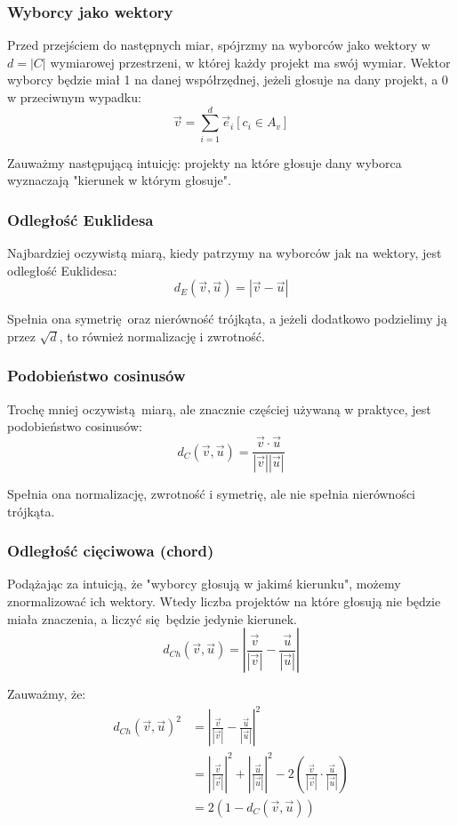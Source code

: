\documentclass{article}
\begin{document}
\subsubsection*{Wyborcy jako wektory}

Przed przejściem do następnych miar, spójrzmy na wyborców jako wektory w
$d = |C|$ wymiarowej przestrzeni, w której każdy projekt ma swój wymiar. Wektor
wyborcy będzie miał 1 na danej współrzędnej, jeżeli głosuje na dany projekt,
a 0 w przeciwnym wypadku:
\[ \vec v = \sum_{i=1}^d \vec e_i [c_i \in A_v] \]

Zauważmy następującą intuicję: projekty na które głosuje dany wyborca
wyznaczają "kierunek w którym głosuje".

\subsubsection{Odległość Euklidesa}

Najbardziej oczywistą miarą, kiedy patrzymy na wyborców jak na wektory, jest
odległość Euklidesa:
\[ d_E(\vec v, \vec u) = | \vec v - \vec u | \]

Spełnia ona symetrię oraz nierówność trójkąta, a jeżeli dodatkowo podzielimy
ją przez $\sqrt d$, to również normalizację i zwrotność.

\subsubsection{Podobieństwo cosinusów}

Trochę mniej oczywistą miarą, ale znacznie częściej używaną w praktyce, jest
podobieństwo cosinusów:
\[ d_C(\vec v, \vec u) = \frac{\vec v \cdot \vec u}{|\vec v||\vec u|} \]

Spełnia ona normalizację, zwrotność i symetrię, ale nie spełnia nierówności
trójkąta.

\subsubsection{Odległość cięciwowa (chord)}

Podążając za intuicją, że "wyborcy głosują w jakimś kierunku", możemy
znormalizować ich wektory. Wtedy liczba projektów na które głosują nie będzie
miała znaczenia, a liczyć się będzie jedynie kierunek.
\[
  d_{Ch}(\vec v, \vec u) =
  \left|\frac{\vec v}{|\vec v|} - \frac{\vec u}{|\vec u|}\right|
\]

Zauważmy, że:
\begin{align*}
  d_{Ch}(\vec v, \vec u)^2
  &= \left|\frac{\vec v}{|\vec v|} - \frac{\vec u}{|\vec u|}\right|^2 \\
  &= \left|\frac{\vec v}{|\vec v|}\right|^2
   + \left|\frac{\vec u}{|\vec u|}\right|^2
   - 2 \left( \frac{\vec v}{|\vec v|} \cdot \frac{\vec u}{|\vec u|} \right) \\
  &= 2(1 - d_C(\vec v, \vec u))
\end{align*}
\end{document}
